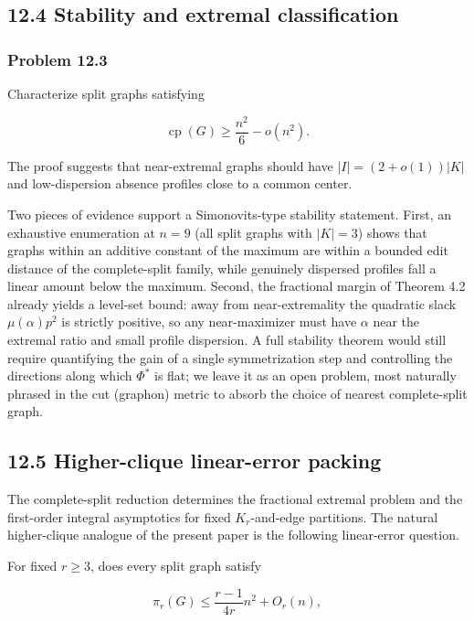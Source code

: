 \documentclass[
  11pt,
]{article}
\begin{document}
\subsection{12.4 Stability and extremal
classification}\label{stability-and-extremal-classification}

\subsubsection{Problem 12.3}\label{problem-12.3}

Characterize split graphs satisfying

\[
\operatorname{cp}(G)
\ge
\frac{n^2}{6}-o(n^2).
\]

The proof suggests that near-extremal graphs should have
\(|I|=(2+o(1))|K|\) and low-dispersion absence profiles close to a
common center.

Two pieces of evidence support a Simonovits-type stability statement.
First, an exhaustive enumeration at \(n=9\) (all split graphs with
\(|K|=3\)) shows that graphs within an additive constant of the maximum
are within a bounded edit distance of the complete-split family, while
genuinely dispersed profiles fall a linear amount below the maximum.
Second, the fractional margin of Theorem 4.2 already yields a level-set
bound: away from near-extremality the quadratic slack \(\mu(\alpha)p^2\)
is strictly positive, so any near-maximizer must have \(\alpha\) near
the extremal ratio and small profile dispersion. A full stability
theorem would still require quantifying the gain of a single
symmetrization step and controlling the directions along which
\(\Phi^*\) is flat; we leave it as an open problem, most naturally
phrased in the cut (graphon) metric to absorb the choice of nearest
complete-split graph.

\subsection{12.5 Higher-clique linear-error
packing}\label{higher-clique-linear-error-packing}

The complete-split reduction determines the fractional extremal problem
and the first-order integral asymptotics for fixed \(K_r\)-and-edge
partitions. The natural higher-clique analogue of the present paper is
the following linear-error question.

For fixed \(r\ge3\), does every split graph satisfy

\[
\pi_r(G)
\le
\frac{r-1}{4r}n^2+O_r(n),
\]
\end{document}
